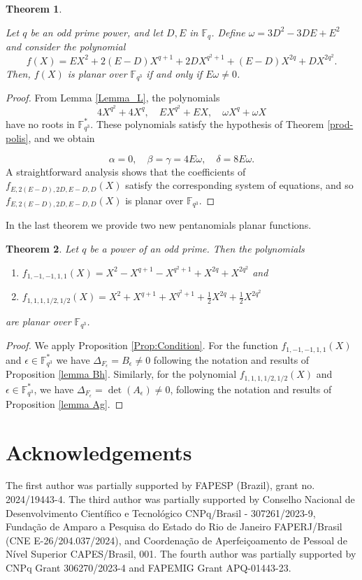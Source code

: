 \documentclass[12pt]{amsart}
\newtheorem{theorem}{Theorem}[section]
\def\e{\epsilon}
\def\e{\epsilon}
\begin{document}
	\begin{theorem}\label{2parametros}
	
	Let $q$ be an odd prime power, and let $D, E$ in  $\mathbb{F}_q$. Define $\omega = 3D^2 - 3DE + E^2$ and consider the polynomial
	$$f(X) =  EX^2 + 2(E-D)X^{q+1} + 2DX^{q^2+1} + (E-D)X^{2q} + DX^{2q^2}.
	$$
	Then, $f(X)$ is planar over $\mathbb{F}_{q^3}$ if and only if $E\omega \neq 0$.
	\end{theorem}
	\begin{proof}	
	From Lemma \ref{Lemma_L}, the polynomials
	$$4X^{q^2} + 4X^q, \quad EX^{q^2} + EX, \quad \omega X^q + \omega X$$
	have no roots in $\mathbb{F}_{q^3}^*$. These polynomials satisfy the hypothesis of Theorem \ref{prod-polis}, and we obtain
	
		$$\alpha = 0, \quad \beta = \gamma = 4E\omega, \quad \delta = 8E\omega.$$
	A straightforward analysis shows that the coefficients of $f_{E,2(E-D), 2D, E-D, D}(X)$ satisfy the corresponding system of equations, and so $f_{E,2(E-D), 2D, E-D, D}(X)$ is planar over $\mathbb{F}_{q^3}$.
	
	
	\end{proof}	
	
		In the last theorem we provide two new pentanomials planar functions.  
	
		\begin{theorem} \label{teo: two pent}
		Let $q$ be a power of an odd prime.  Then the polynomials
		\begin{enumerate}
			\item $f_{1,-1,-1,1,1}(X) = X^2 - X^{q+1} - X^{q^2+1} + X^{2q} + X^{2q^2}$ and 
			\item $f_{1,1,1,1/2,1/2}(X) = X^2 + X^{q+1} + X^{q^2 + 1} + \frac{1}{2}X^{2q} + \frac{1}{2} X^{2q^2}$
		\end{enumerate}
			are planar over $\mathbb{F}_{q^3}$.
	\end{theorem}	
	\begin{proof}
		We apply Proposition \ref{Prop:Condition}. For the function $f_{1,-1,-1,1,1}(X)$ and
		 $\e \in \mathbb{F}_{q^3}^{\ast}$ we have 
		$
		\Delta_{F_\e}= B_\e \neq 0$ following the notation and results of Proposition  \ref{lemma Bh}.	Similarly, for the polynomial $f_{1,1,1,1/2,1/2}(X)$ and $\epsilon \in \mathbb{F}_{q^3}^{\ast}$, we have $\Delta_{F_\epsilon} = \det(A_\epsilon) \neq 0$, following the notation and results of Proposition \ref{lemma Ag}.
	\end{proof}	
	
	\section*{Acknowledgements}
	The first author was partially supported by FAPESP (Brazil), grant no. 2024/19443-4. The third author was partially supported by Conselho
Nacional de Desenvolvimento Científico e Tecnológico  CNPq/Brasil - 307261/2023-9, Fundação de Amparo a Pesquisa do Estado do Rio de Janeiro FAPERJ/Brasil (CNE E-26/204.037/2024), and Coordenação de Aperfeiçoamento de Pessoal de Nível Superior CAPES/Brasil, 001. The fourth author was partially supported by CNPq Grant 306270/2023-4 and FAPEMIG Grant APQ-01443-23.
		
\end{document}
